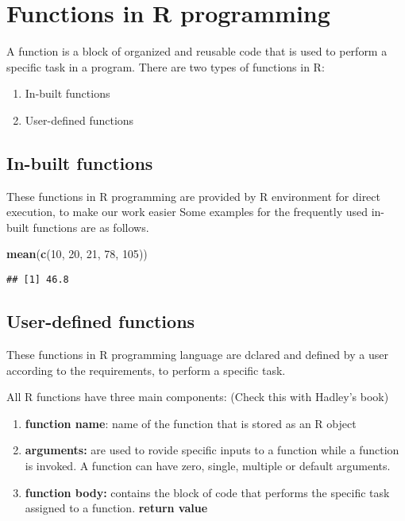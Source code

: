 \documentclass[]{book}
\newenvironment{Shaded}{\begin{snugshade}}{\end{snugshade}}
\newcommand{\DecValTok}[1]{\textcolor[rgb]{0.00,0.00,0.81}{#1}}
\newcommand{\KeywordTok}[1]{\textcolor[rgb]{0.13,0.29,0.53}{\textbf{#1}}}
\newcommand{\NormalTok}[1]{#1}
\begin{document}
\hypertarget{functions-in-r-programming}{%
\chapter{Functions in R programming}\label{functions-in-r-programming}}

A function is a block of organized and reusable code that is used to perform a specific task in a program. There are two types of functions in R:

\begin{enumerate}
\def\labelenumi{\arabic{enumi}.}
\item
  In-built functions
\item
  User-defined functions
\end{enumerate}

\hypertarget{in-built-functions}{%
\section{In-built functions}\label{in-built-functions}}

These functions in R programming are provided by R environment for direct execution, to make our work easier Some examples for the frequently used in-built functions are as follows.

\begin{Shaded}
\begin{Highlighting}[]
\KeywordTok{mean}\NormalTok{(}\KeywordTok{c}\NormalTok{(}\DecValTok{10}\NormalTok{, }\DecValTok{20}\NormalTok{, }\DecValTok{21}\NormalTok{, }\DecValTok{78}\NormalTok{, }\DecValTok{105}\NormalTok{))}
\end{Highlighting}
\end{Shaded}

\begin{verbatim}
## [1] 46.8
\end{verbatim}

\hypertarget{user-defined-functions}{%
\section{User-defined functions}\label{user-defined-functions}}

These functions in R programming language are dclared and defined by a user according to the requirements, to perform a specific task.

All R functions have three main components: (Check this with Hadley's book)

\begin{enumerate}
\def\labelenumi{\arabic{enumi}.}
\item
  \textbf{function name}: name of the function that is stored as an R object
\item
  \textbf{arguments:} are used to rovide specific inputs to a function while a function is invoked. A function can have zero, single, multiple or default arguments.
\item
  \textbf{function body:} contains the block of code that performs the specific task assigned to a function. \textbf{return value}
\end{enumerate}
\end{document}
